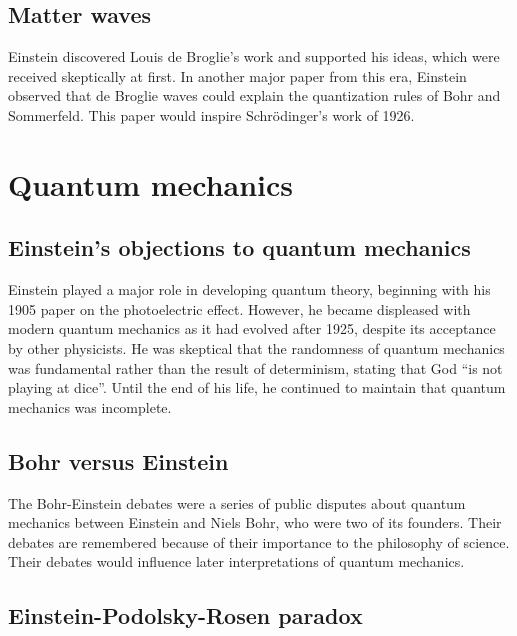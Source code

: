 \documentclass[twoside]{memoir}
\begin{document}
\section{Matter waves}\label{matter-waves}

Einstein discovered Louis de Broglie's  work and supported his ideas, which were received skeptically at first. In another major paper from this era, Einstein observed that de Broglie waves could explain the quantization rules of Bohr and Sommerfeld. This paper would inspire Schrödinger's work of 1926.\cite{Hanle_1979,Raman_1969}

\chapter{Quantum mechanics}\label{quantum-mechanics}

\section{Einstein's objections to quantum mechanics}\label{einstein-s-objections-to-quantum-mechanics}

Einstein played a major role in developing quantum theory, beginning with his 1905 paper on the photoelectric effect.  However, he became displeased with modern quantum mechanics as it had evolved after 1925, despite its acceptance by other physicists. He was skeptical that the randomness of quantum mechanics was fundamental rather than the result of determinism, stating that God \enquote{is not playing at dice}.\cite{zZ2hS} Until the end of his life, he continued to maintain that quantum mechanics was incomplete.\cite{yzZtL}

\section{Bohr versus Einstein}\label{bohr-versus-einstein}

The Bohr-Einstein debates were a series of public disputes about quantum mechanics between Einstein and Niels Bohr,  who were two of its founders. Their debates are remembered because of their importance to the philosophy of science.\cite{Schlosshauer_2013} Their debates would influence later interpretations of quantum mechanics.

\section{Einstein-Podolsky-Rosen paradox}\label{einstein-podolsky-rosen-paradox}
\end{document}
